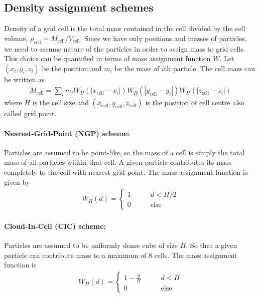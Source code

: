 \documentclass[12pt]{article}
\begin{document}
\subsection*{Density assignment schemes}
Density of a grid cell is the total mass contained in the cell divided by the cell volume, $\rho_{\text{cell}} = M_{\text{cell}} / V_{\text{cell}}$. Since we have only positions and masses of particles, we need to assume nature of the particles in order to assign mass to grid cells. This choice can be quantified in terms of mass assignment function $W$. Let $(x_{i}, y_{i}, z_{i})$ be the position and $m_{i}$ be the mass of $i$th particle. The cell mass can be written as
\begin{align}
M_{\text{cell}} = \sum_{i} m_{i} W_{H} \left( |x_{\text{cell}} - x_{i}| \right) W_{H} \left( |y_{\text{cell}} - y_{i}| \right) W_{H} \left( |z_{\text{cell}} - z_{i}| \right)
\end{align}
where $H$ is the cell size and $(x_{\text{cell}}, y_{\text{cell}}, z_{\text{cell}})$ is the position of cell centre also called grid point.


\paragraph{Nearest-Grid-Point (NGP) scheme:}
Particles are assumed to be point-like, so the mass of a cell is
simply the total mass of all particles within that cell. A given particle contributes its mass completely to the cell with nearest grid point. The mass assignment function is given by
\begin{align}
W_{H}(d) = \begin{cases}
1 &\qquad d < H/2\\
0 &\qquad \text{else}
\end{cases}
\end{align}



\paragraph{Cloud-In-Cell (CIC) scheme:}
Particles are assumed to be uniformly dense cube of size $H$. So that a given particle can contribute mass to a maximum of 8 cells. The mass assignment function is
\begin{align}
W_{H}(d) = \begin{cases} \displaystyle
1- \frac{d}{H} &\qquad d < H\\
0 &\qquad \text{else}
\end{cases}
\end{align}
\end{document}
